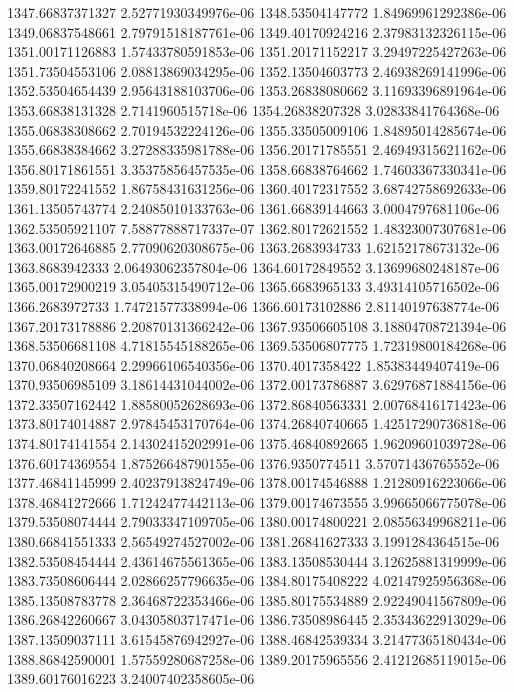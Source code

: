{1347.66837371327 2.52771930349976e-06
1348.53504147772 1.84969961292386e-06
1349.06837548661 2.79791518187761e-06
1349.40170924216 2.37983132326115e-06
1351.00171126883 1.57433780591853e-06
1351.20171152217 3.29497225427263e-06
1351.73504553106 2.08813869034295e-06
1352.13504603773 2.46938269141996e-06
1352.53504654439 2.95643188103706e-06
1353.26838080662 3.11693396891964e-06
1353.66838131328 2.7141960515718e-06
1354.26838207328 3.02833841764368e-06
1355.06838308662 2.70194532224126e-06
1355.33505009106 1.84895014285674e-06
1355.66838384662 3.27288335981788e-06
1356.20171785551 2.46949315621162e-06
1356.80171861551 3.35375856457535e-06
1358.66838764662 1.74603367330341e-06
1359.80172241552 1.86758431631256e-06
1360.40172317552 3.68742758692633e-06
1361.13505743774 2.24085010133763e-06
1361.66839144663 3.0004797681106e-06
1362.53505921107 7.58877888717337e-07
1362.80172621552 1.48323007307681e-06
1363.00172646885 2.77090620308675e-06
1363.2683934733 1.62152178673132e-06
1363.8683942333 2.06493062357804e-06
1364.60172849552 3.13699680248187e-06
1365.00172900219 3.05405315490712e-06
1365.6683965133 3.49314105716502e-06
1366.2683972733 1.74721577338994e-06
1366.60173102886 2.81140197638774e-06
1367.20173178886 2.20870131366242e-06
1367.93506605108 3.18804708721394e-06
1368.53506681108 4.71815545188265e-06
1369.53506807775 1.72319800184268e-06
1370.06840208664 2.29966106540356e-06
1370.4017358422 1.85383449407419e-06
1370.93506985109 3.18614431044002e-06
1372.00173786887 3.62976871884156e-06
1372.33507162442 1.88580052628693e-06
1372.86840563331 2.00768416171423e-06
1373.80174014887 2.97845453170764e-06
1374.26840740665 1.42517290736818e-06
1374.80174141554 2.14302415202991e-06
1375.46840892665 1.96209601039728e-06
1376.60174369554 1.87526648790155e-06
1376.9350774511 3.57071436765552e-06
1377.46841145999 2.40237913824749e-06
1378.00174546888 1.21280916223066e-06
1378.46841272666 1.71242477442113e-06
1379.00174673555 3.99665066775078e-06
1379.53508074444 2.79033347109705e-06
1380.00174800221 2.08556349968211e-06
1380.66841551333 2.56549274527002e-06
1381.26841627333 3.1991284364515e-06
1382.53508454444 2.43614675561365e-06
1383.13508530444 3.12625881319999e-06
1383.73508606444 2.02866257796635e-06
1384.80175408222 4.02147925956368e-06
1385.13508783778 2.36468722353466e-06
1385.80175534889 2.92249041567809e-06
1386.26842260667 3.04305803717471e-06
1386.73508986445 2.35343622913029e-06
1387.13509037111 3.61545876942927e-06
1388.46842539334 3.21477365180434e-06
1388.86842590001 1.57559280687258e-06
1389.20175965556 2.41212685119015e-06
1389.60176016223 3.24007402358605e-06
}
